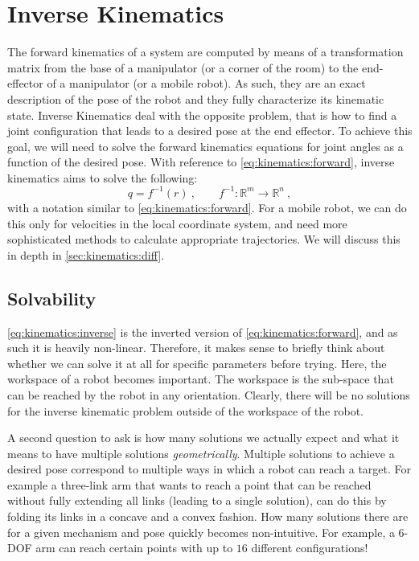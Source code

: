\section{Inverse Kinematics}\label{sec:kinematics:ik}

The forward kinematics of a system are computed by means of a transformation matrix from the base of a manipulator (or a corner of the room) to the end-effector of a manipulator (or a mobile robot).
As such, they are an exact description of the pose of the robot and they fully characterize its kinematic state.
Inverse Kinematics deal with the opposite problem, that is how to find a joint configuration that leads to a desired pose at the end effector.
To achieve this goal, we will need to solve the forward kinematics equations for joint angles as a function of the desired pose.
With reference to \cref{eq:kinematics:forward}, inverse kinematics aims to solve the following:
\begin{equation}\label{eq:kinematics:inverse}
q = f^{-1} (r)\ , \qquad f^{-1} : \mathbb{R}^m \rightarrow \mathbb{R}^n \ ,
\end{equation}
with a notation similar to \cref{eq:kinematics:forward}.
For a mobile robot, we can do this only for velocities in the local coordinate system, and need more sophisticated methods to calculate appropriate trajectories. We will discuss this in depth in \cref{sec:kinematics:diff}.

\subsection{Solvability}

\cref{eq:kinematics:inverse} is the inverted version of \cref{eq:kinematics:forward}, and as such it is heavily non-linear.
Therefore, it makes sense to briefly think about whether we can solve it at all for specific parameters before trying.
Here, the workspace of a robot becomes important. The workspace is the sub-space that can be reached by the robot in any orientation.
Clearly, there will be no solutions for the inverse kinematic problem outside of the workspace of the robot.

A second question to ask is how many solutions we actually expect and what it means to have multiple solutions \textsl{geometrically}.
Multiple solutions to achieve a desired pose correspond to multiple ways in which a robot can reach a target.
For example a three-link arm that wants to reach a point that can be reached without fully extending all links (leading to a single solution), can do this by folding its links in a concave and a convex fashion.
How many solutions there are for a given mechanism and pose quickly becomes non-intuitive.
For example, a 6-DOF arm can reach certain points with up to $16$ different configurations!

